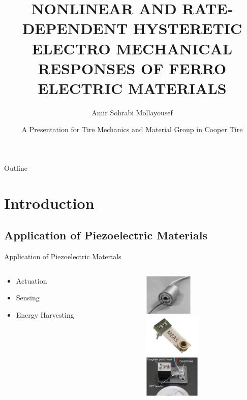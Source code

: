 \documentclass{beamer}
\title[Research Proposal] %
{NONLINEAR AND RATE-DEPENDENT HYSTERETIC ELECTRO MECHANICAL RESPONSES OF FERRO ELECTRIC MATERIALS}
\author [Sohrabi Mollayousef, Amir] %
{Amir Sohrabi Mollayousef}
\institute[Texas A\&M University] %
{ Department of Mechanical Engineering\\
  Texas A\&M University}
\date[16th December 2014] %
{A Presentation for Tire Mechanics and Material Group in Cooper Tire}
\begin{document}
\begin{frame}
  \titlepage
\end{frame}

\begin{frame}{Outline}
  \tableofcontents
\end{frame}

\section{Introduction} 

\subsection{Application of Piezoelectric Materials}

\begin{frame}{Application of Piezoelectric Materials}

     \begin{columns}[t] 
     \begin{column}[T]{5cm} 
       \begin{itemize} \itemsep8ex
  \item  Actuation \cite{Berner1999}
  \item  Sensing
   \item  Energy Harvesting \cite{roundy2004piezoelectric}
  \end{itemize} 
     \end{column}
     \begin{column}[T]{5cm} 
      \includegraphics[height=2cm]{../images/telescpic_actuator_picture}\\
      \includegraphics[height=2cm]{../images/piezeo_sensor}\\
      \includegraphics[height=2cm]{../images/piezeo_harvester}\\     
     \end{column}
     \end{columns}    
\end{frame}
\end{document}
